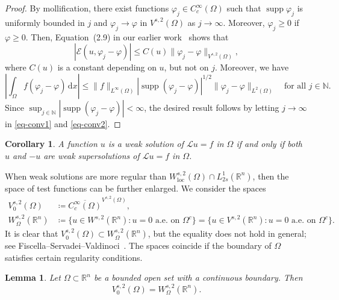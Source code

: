 \documentclass[11pt]{amsart}
\theoremstyle{plain}
\newtheorem{lemma}[theorem]{Lemma}
\newtheorem{corollary}[theorem]{Corollary}
\theoremstyle{definition}
\numberwithin{equation}{section}
\DeclareMathOperator{\supp}{supp}
\begin{document}
\begin{proof}
By mollification, there exist functions $\varphi_j \in C^\infty_c(\Omega)$ such that $\supp\varphi_j$ is uniformly bounded in $j$ and $\varphi_j \to \varphi$ in $V^{s, 2}(\Omega)$ as $j \to \infty$. Moreover, $\varphi_j \geq 0$ if $\varphi \geq 0$. Then, Equation~(2.9) in our earlier work~\cite{KL23} shows that
\begin{equation}\label{eq-conv1}
|\mathcal{E}(u, \varphi_j - \varphi)| \leq C(u) \|\varphi_j - \varphi\|_{V^{s, 2}(\Omega)},
\end{equation}
where $C(u)$ is a constant depending on $u$, but not on $j$. Moreover, we have
\begin{equation}\label{eq-conv2}
\left| \int_{\Omega} f(\varphi_j-\varphi) \,\mathrm{d}x \right| \leq \|f\|_{L^\infty(\Omega)} |\supp(\varphi_j-\varphi)|^{1/2} \|\varphi_j-\varphi\|_{L^2(\Omega)} \quad\text{for all }j \in \mathbb{N}.
\end{equation}
Since $\sup_{j \in \mathbb{N}} |\supp(\varphi_j-\varphi)| < \infty$, the desired result follows by letting $j \to \infty$ in \eqref{eq-conv1} and \eqref{eq-conv2}.
\end{proof}

\begin{corollary}
A function $u$ is a weak solution of $\mathcal{L}u=f$ in $\Omega$ if and only if both $u$ and $-u$ are weak supersolutions of $\mathcal{L}u=f$ in $\Omega$.
\end{corollary}

When weak solutions are more regular than $W^{s, 2}_{\mathrm{loc}}(\Omega) \cap L^1_{2s}(\mathbb{R}^n)$, then the space of test functions can be further enlarged. We consider the spaces
\begin{align*}
V^{s, 2}_0(\Omega) &\coloneqq \overline{C^\infty_c(\Omega)}^{V^{s, 2}(\Omega)}, \\
W^{s, 2}_\Omega(\mathbb{R}^n) &\coloneqq \{u \in W^{s, 2}(\mathbb{R}^n): u=0\text{ a.e.\ on }\Omega^c\} = \{u \in V^{s, 2}(\mathbb{R}^n): u=0\text{ a.e.\ on }\Omega^c\}.
\end{align*}
It is clear that $V^{s, 2}_0(\Omega) \subset W^{s, 2}_\Omega(\mathbb{R}^n)$, but the equality does not hold in general; see Fiscella--Servadei--Valdinoci~\cite{FSV15}. The spaces coincide if the boundary of $\Omega$ satisfies certain regularity conditions.

\begin{lemma}\cite{FSV15}\label{lem-test}
Let $\Omega \subset \mathbb{R}^n$ be a bounded open set with a continuous boundary. Then
\begin{equation*}
V^{s, 2}_0(\Omega) = W^{s, 2}_\Omega(\mathbb{R}^n).
\end{equation*}
\end{lemma}
\end{document}
